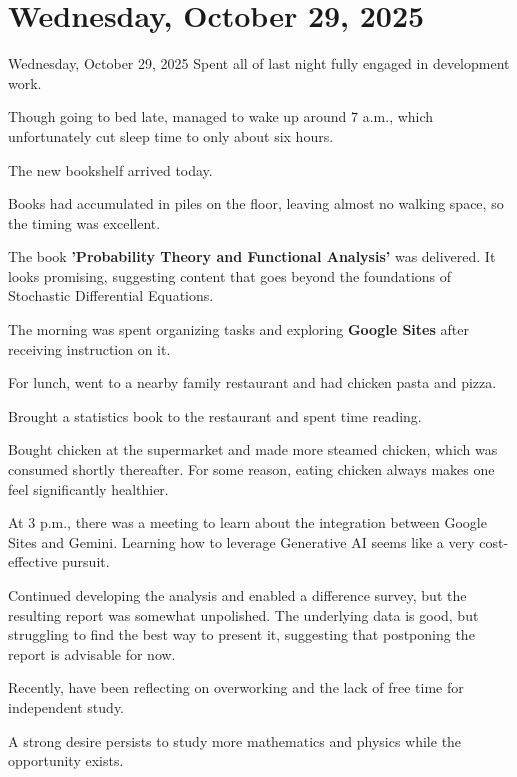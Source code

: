 \documentclass[dvipdfmx, autodetect-engine, aspectratio=169, 10.5pt]{beamer}
\begin{document}
\section{Wednesday, October 29, 2025}
\begin{frame}{Wednesday, October 29, 2025}
\scriptsize
Spent all of last night fully engaged in development work.

Though going to bed late, managed to wake up around 7 a.m., which unfortunately cut sleep time to only about six hours.

The new bookshelf arrived today.

Books had accumulated in piles on the floor, leaving almost no walking space, so the timing was excellent.

The book \textbf{'Probability Theory and Functional Analysis'} was delivered. It looks promising, suggesting content that goes beyond the foundations of Stochastic Differential Equations.

The morning was spent organizing tasks and exploring \textbf{Google Sites} after receiving instruction on it.

For lunch, went to a nearby family restaurant and had chicken pasta and pizza.

Brought a statistics book to the restaurant and spent time reading.

Bought chicken at the supermarket and made more steamed chicken, which was consumed shortly thereafter. For some reason, eating chicken always makes one feel significantly healthier.

At 3 p.m., there was a meeting to learn about the integration between Google Sites and Gemini. Learning how to leverage Generative AI seems like a very cost-effective pursuit.

Continued developing the analysis and enabled a difference survey, but the resulting report was somewhat unpolished. The underlying data is good, but struggling to find the best way to present it, suggesting that postponing the report is advisable for now.

Recently, have been reflecting on overworking and the lack of free time for independent study.

A strong desire persists to study more mathematics and physics while the opportunity exists.
\end{frame}
\end{document}
